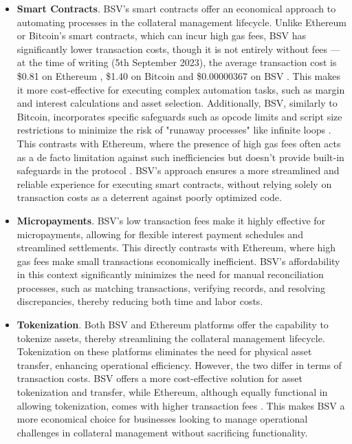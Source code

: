 \begin{itemize}
    \item \label{item:smart_contracts} \textbf{Smart Contracts}. BSV's smart contracts offer an economical approach to automating processes in the collateral management lifecycle. Unlike Ethereum or Bitcoin's smart contracts, which can incur high gas fees, BSV has significantly lower transaction costs, though it is not entirely without fees --- at the time of writing (5th September 2023), the average transaction cost is \$0.81 on Ethereum \citep{eth_tx_fee}, \$1.40 on Bitcoin \citep{btc_tx_fee} and \$0.00000367 on BSV \citep{bsv_tx_fee}. This makes it more cost-effective for executing complex automation tasks, such as margin and interest calculations and asset selection. Additionally, BSV, similarly to Bitcoin, incorporates specific safeguards such as opcode limits and script size restrictions to minimize the risk of "runaway processes" like infinite loops \citep{btc_limits_safeguards}. This contrasts with Ethereum, where the presence of high gas fees often acts as a de facto limitation against such inefficiencies but doesn't provide built-in safeguards in the protocol \citep{eth_loops}. BSV's approach ensures a more streamlined and reliable experience for executing smart contracts, without relying solely on transaction costs as a deterrent against poorly optimized code.
    
    \item \textbf{Micropayments}. BSV's low transaction fees make it highly effective for micropayments, allowing for flexible interest payment schedules and streamlined settlements. This directly contrasts with Ethereum, where high gas fees make small transactions economically inefficient. BSV's affordability in this context significantly minimizes the need for manual reconciliation processes, such as matching transactions, verifying records, and resolving discrepancies, thereby reducing both time and labor costs.
    
    \item \textbf{Tokenization}. Both BSV and Ethereum platforms offer the capability to tokenize assets, thereby streamlining the collateral management lifecycle. Tokenization on these platforms eliminates the need for physical asset transfer, enhancing operational efficiency. However, the two differ in terms of transaction costs. BSV offers a more cost-effective solution for asset tokenization and transfer, while Ethereum, although equally functional in allowing tokenization, comes with higher transaction fees \citep{di2020tokens}. This makes BSV a more economical choice for businesses looking to manage operational challenges in collateral management without sacrificing functionality.
\end{itemize}